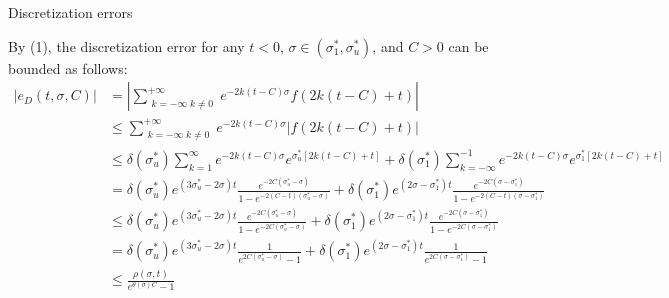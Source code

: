 \documentclass{beamer}
\begin{document}
\begin{frame}{Discretization errors}


    {\footnotesize \scriptsize

    \par By (1), the discretization error for any \( t < 0 \), \( \sigma \in (\sigma_1^*, \sigma_u^*)\),
     and \( C > 0 \) can be bounded as follows:
    \begin{align*}
        \left| e_D(t, \sigma, C) \right| &= \left| \sum_{\substack{k=-\infty \; k \neq 0}}^{+\infty} e^{-2k(t-C)\sigma} f(2k(t - C) + t) \right|\\
        &\leq \sum_{\substack{k=-\infty \; k \neq 0}}^{+\infty} e^{-2k(t-C)\sigma} |f(2k(t - C) + t)|\\
        & \leq \delta(\sigma_u^*) \sum_{k=1}^\infty e^{-2k(t-C)\sigma} e^{\sigma_u^*[2k(t-C)+t]} 
        + \delta(\sigma_1^*) \sum_{k=-\infty}^{-1} e^{-2k(t-C)\sigma} e^{\sigma_1^*[2k(t-C)+t]}\\
        &= \delta(\sigma_{u}^{*})e^{(3\sigma_{u}^{*}-2\sigma)t} \frac{e^{-2C(\sigma_{u}^{*}-\sigma)}}{1-e^{-2(C-t)(\sigma_{u}^{*}-\sigma)}} 
        + \delta(\sigma_{1}^{*})e^{(2\sigma-\sigma_{1}^{*})t} \frac{e^{-2C(\sigma-\sigma_{1}^{*})}}{1-e^{-2(C-t)(\sigma-\sigma_{1}^{*})}}\\
        & \leq \delta(\sigma_{u}^{*})e^{(3\sigma_{u}^{*}-2\sigma)t} \frac{e^{-2C(\sigma_{u}^{*}-\sigma)}}{1-e^{-2C(\sigma_{u}^{*}-\sigma)}} 
        + \delta(\sigma_{1}^{*})e^{(2\sigma-\sigma_{1}^{*})t} \frac{e^{-2C(\sigma-\sigma_{1}^{*})}}{1-e^{-2C(\sigma-\sigma_{1}^{*})}}\\
        &= \delta(\sigma_{u}^{*})e^{(3\sigma_{u}^{*}-2\sigma)t} \frac{1}{e^{2C(\sigma_{u}^{*}-\sigma)}-1}
        + \delta(\sigma_{1}^{*})e^{(2\sigma-\sigma_{1}^{*})t} \frac{1}{e^{2C(\sigma-\sigma_{1}^{*})}-1}\\
        &\leq \frac{\rho(\sigma,t)}{e^{\theta(\sigma)C}-1}
    \end{align*}
    }
    
\end{frame}
\end{document}
